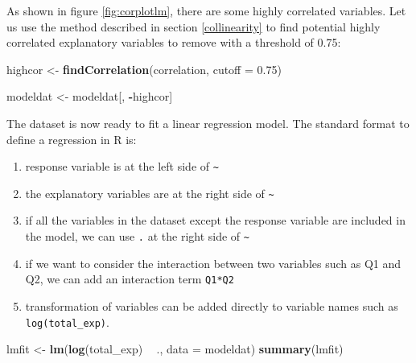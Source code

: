 \documentclass[12pt,]{krantz}
\makeatletter
\newenvironment{Shaded}{\begin{snugshade}}{\end{snugshade}}
\newcommand{\DataTypeTok}[1]{\textcolor[rgb]{0.27,0.27,0.27}{#1}}
\newcommand{\FloatTok}[1]{\textcolor[rgb]{0.06,0.06,0.06}{#1}}
\newcommand{\KeywordTok}[1]{\textcolor[rgb]{0.27,0.27,0.27}{\textbf{#1}}}
\newcommand{\NormalTok}[1]{#1}
\newcommand{\OperatorTok}[1]{\textcolor[rgb]{0.43,0.43,0.43}{\textbf{#1}}}
\newcommand{\StringTok}[1]{\textcolor[rgb]{0.5,0.5,0.5}{#1}}
\newenvironment{kframe}{%
\medskip{}
\setlength{\fboxsep}{.8em}
 \def\at@end@of@kframe{}%
 \ifinner\ifhmode%
  \def\at@end@of@kframe{\end{minipage}}%
  \begin{minipage}{\columnwidth}%
 \fi\fi%
 \def\FrameCommand##1{\hskip\@totalleftmargin \hskip-\fboxsep
 \colorbox{shadecolor}{##1}\hskip-\fboxsep
     \hskip-\linewidth \hskip-\@totalleftmargin \hskip\columnwidth}%
 \MakeFramed {\advance\hsize-\width
   \@totalleftmargin\z@ \linewidth\hsize
   \@setminipage}}%
 {\par\unskip\endMakeFramed%
 \at@end@of@kframe}
\renewenvironment{Shaded}{\begin{kframe}}{\end{kframe}}
\makeatother
\begin{document}
As shown in figure \ref{fig:corplotlm}, there are some highly correlated variables. Let us use the method described in section \ref{collinearity} to find potential highly correlated explanatory variables to remove with a threshold of 0.75:

\begin{Shaded}
\begin{Highlighting}[]
\NormalTok{highcor <-}\StringTok{ }\KeywordTok{findCorrelation}\NormalTok{(correlation, }\DataTypeTok{cutoff =} \FloatTok{0.75}\NormalTok{)}
\end{Highlighting}
\end{Shaded}

\begin{Shaded}
\begin{Highlighting}[]
\NormalTok{modeldat <-}\StringTok{ }\NormalTok{modeldat[, }\OperatorTok{-}\NormalTok{highcor]}
\end{Highlighting}
\end{Shaded}

The dataset is now ready to fit a linear regression model. The standard format to define a regression in R is:

\begin{enumerate}
\def\labelenumi{(\arabic{enumi})}
\item
  response variable is at the left side of \texttt{\textasciitilde{}}
\item
  the explanatory variables are at the right side of \texttt{\textasciitilde{}}
\item
  if all the variables in the dataset except the response variable are included in the model, we can use \texttt{.} at the right side of \texttt{\textasciitilde{}}
\item
  if we want to consider the interaction between two variables such as Q1 and Q2, we can add an interaction term \texttt{Q1*Q2}
\item
  transformation of variables can be added directly to variable names such as \texttt{log(total\_exp)}.
\end{enumerate}

\begin{Shaded}
\begin{Highlighting}[]
\NormalTok{lmfit <-}\StringTok{ }\KeywordTok{lm}\NormalTok{(}\KeywordTok{log}\NormalTok{(total_exp) }\OperatorTok{~}\StringTok{ }\NormalTok{., }\DataTypeTok{data =}\NormalTok{ modeldat)}
\KeywordTok{summary}\NormalTok{(lmfit)}
\end{Highlighting}
\end{Shaded}
\end{document}
